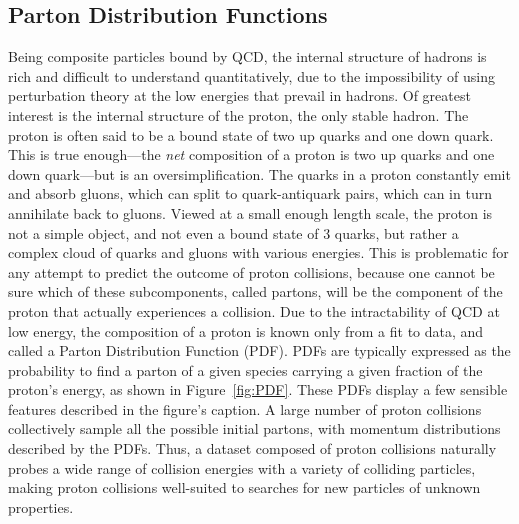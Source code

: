   \subsection{Parton Distribution Functions} \label{sec:PDFs}

  Being composite particles bound by QCD, the internal structure of hadrons is rich and difficult to understand quantitatively, due to the impossibility of using perturbation theory at the low energies that prevail in hadrons.
  Of greatest interest is the internal structure of the proton, the only stable hadron.
  The proton is often said to be a bound state of two up quarks and one down quark.
  This is true enough---the {\it net} composition of a proton is two up quarks and one down quark---but is an oversimplification.
  The quarks in a proton constantly emit and absorb gluons, which can split to quark-antiquark pairs, which can in turn annihilate back to gluons.
  Viewed at a small enough length scale, the proton is not a simple object, and not even a bound state of 3 quarks, but rather a complex cloud of quarks and gluons with various energies.
  This is problematic for any attempt to predict the outcome of proton collisions, because one cannot be sure which of these subcomponents, called partons, will be the component of the proton that actually experiences a collision.
  Due to the intractability of QCD at low energy, the composition of a proton is known only from a fit to data, and called a Parton Distribution Function (PDF).
  PDFs are typically expressed as the probability to find a parton of a given species carrying a given fraction of the proton's energy, as shown in Figure~\ref{fig:PDF}.
  These PDFs display a few sensible features described in the figure's caption.
  A large number of proton collisions collectively sample all the possible initial partons, with momentum distributions described by the PDFs.
  Thus, a dataset composed of proton collisions naturally probes a wide range of collision energies with a variety of colliding particles, making proton collisions well-suited to searches for new particles of unknown properties.

